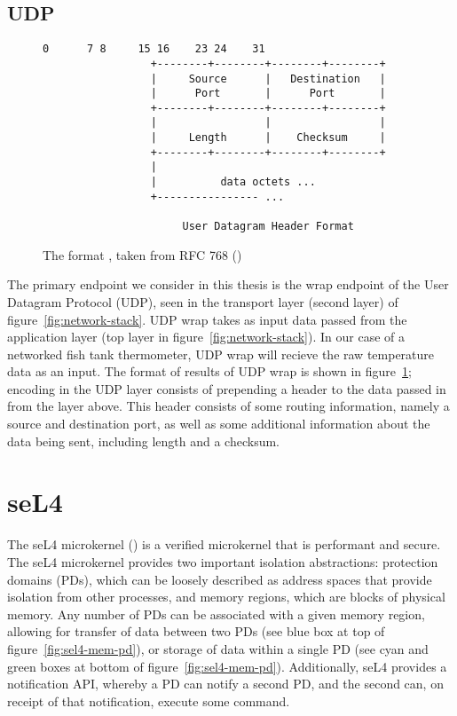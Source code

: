 \documentclass[twoside]{memoir}
\begin{document}
\subsection{UDP}
\begin{figure}[htb]
    \centering
\begin{lstlisting}[language=file]
                  0      7 8     15 16    23 24    31
                 +--------+--------+--------+--------+
                 |     Source      |   Destination   |
                 |      Port       |      Port       |
                 +--------+--------+--------+--------+
                 |                 |                 |
                 |     Length      |    Checksum     |
                 +--------+--------+--------+--------+
                 |
                 |          data octets ...
                 +---------------- ...

                      User Datagram Header Format
\end{lstlisting}
    \caption{The format , taken from RFC 768 (\cite{rfc768})}
    \label{fig:udp-wrap-rfc}
\end{figure}
The primary endpoint we consider in this thesis is
the wrap endpoint of the User Datagram Protocol (UDP),
seen in the transport layer (second layer) of figure~\ref{fig:network-stack}.
UDP wrap takes as input data passed from the application layer (top layer in figure~\ref{fig:network-stack}).
In our case of a networked fish tank thermometer, UDP wrap will recieve the raw temperature data as an input.
The format of results of UDP wrap is shown in figure~\ref{fig:udp-wrap-rfc};
encoding in the UDP layer consists of prepending a header
to the data passed in from the layer above.
This header consists of some routing information, namely a source and
destination port, as well as some additional information about the
data being sent, including length and a checksum.



\section{seL4}
The seL4 microkernel (\cite{Klein2014Verification}) is a verified microkernel
that is performant and secure.
The seL4 microkernel provides two important isolation abstractions:
protection domains (PDs),
which can be loosely described as address spaces that provide isolation from
other processes,
and memory regions, which are blocks of physical memory.
Any number of PDs can be associated with a given memory region,
allowing for transfer of data between two PDs 
(see blue box at top of figure~\ref{fig:sel4-mem-pd}),
or storage of data within
a single PD
(see cyan and green boxes at bottom of figure~\ref{fig:sel4-mem-pd}).
Additionally, seL4 provides a notification API,
whereby a PD can notify a second PD, and the second can,
on receipt of that notification, execute some command.
\end{document}
